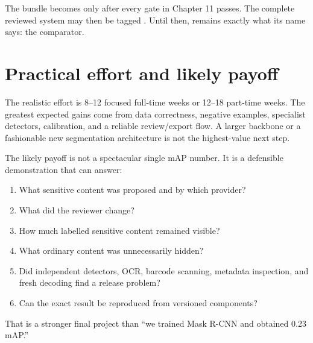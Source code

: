 The bundle becomes  only after every gate in Chapter 11 passes. The complete reviewed system may then be tagged . Until then,  remains exactly what its name says: the comparator.

\section{Practical effort and likely payoff}

The realistic effort is 8--12 focused full-time weeks or 12--18 part-time weeks. The greatest expected gains come from data correctness, negative examples, specialist detectors, calibration, and a reliable review/export flow. A larger backbone or a fashionable new segmentation architecture is not the highest-value next step.

The likely payoff is not a spectacular single mAP number. It is a defensible demonstration that can answer:

\enlargethispage{4\baselineskip}
\begin{enumerate}[leftmargin=7mm]
  \item What sensitive content was proposed and by which provider?
  \item What did the reviewer change?
  \item How much labelled sensitive content remained visible?
  \item What ordinary content was unnecessarily hidden?
  \item Did independent detectors, OCR, barcode scanning, metadata inspection, and fresh decoding find a release problem?
  \item Can the exact result be reproduced from versioned components?
\end{enumerate}

That is a stronger final project than ``we trained Mask R-CNN and obtained 0.23 mAP.''
